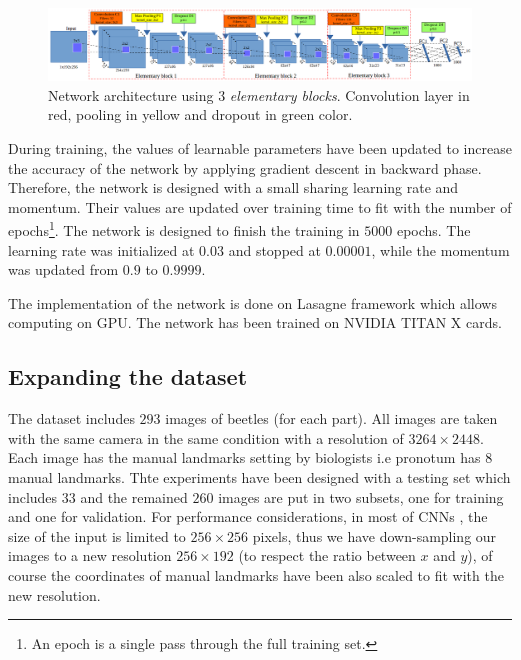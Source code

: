\documentclass[10pt]{article}
\begin{document}
\begin{figure}[!t]
\centering
\includegraphics[scale=0.32]{images/arch_model}
\caption{{\small{Network architecture using $3$ \textit{elementary blocks}.
  Convolution
  layer in red, pooling in yellow and dropout in green color.}}} 
\label{cnnnetwork2}
\end{figure}

During training, the values of learnable parameters have been updated
to increase the accuracy of the network by applying gradient descent
in backward phase. Therefore, the network is designed with a small
sharing learning rate and momentum. Their values are updated over
training time to fit with the number of epochs\footnote{An epoch is a
  single pass through the full training set.}. The network is designed
to finish the training in $5000$ epochs. The learning rate was
initialized at $0.03$ and stopped at $0.00001$, while the momentum was
updated from $0.9$ to $0.9999$.


The implementation of the network is done
on Lasagne framework \cite{lasagne} which allows computing on GPU. The
network has been trained on NVIDIA TITAN X cards.


\subsection{Expanding the dataset}
\label{sec_data}
The dataset includes $293$ images of beetles (for each part). All
images are taken with the same camera in the same condition with a
resolution of $3264 \times 2448$. Each image has the manual
landmarks setting by biologists i.e pronotum has $8$ manual landmarks. Thte
experiments have been designed with a testing set which includes $33$
and the remained $260$ images are put in two subsets, one for
training and one for validation. For performance considerations, in most of CNNs
\cite{lecun2010convolutional, sun2013deep,  krizhevsky2012imagenet,
  cintas2016automatic}, the size of the input is limited to $256
\times 256$ pixels, thus we have down-sampling our images to a new
resolution $256 \times 192$ (to respect the ratio between $x$ and
$y$), of course the coordinates of manual landmarks have been also
scaled to fit with the new resolution.
\end{document}
